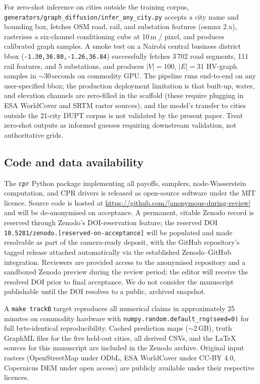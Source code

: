 \documentclass[10pt,a4paper]{article}
\begin{document}
For zero-shot inference on cities outside the training corpus,
\texttt{generators/graph\_diffusion/infer\_any\_city.py} accepts
a city name and bounding box, fetches OSM road, rail, and
substation features (osmnx 2.x), rasterises a six-channel
conditioning cube at 10\,m / pixel, and produces calibrated
graph samples. A smoke test on a Nairobi central business
district bbox (\texttt{-1.30,36.80,-1.26,36.84}) successfully
fetches 3\,702 road segments, 111 rail features, and 5
substations, and produces $|V| = 100$, $|E| = 31$ HV-graph
samples in $\sim$30\,seconds on commodity GPU. The pipeline
runs end-to-end on any user-specified bbox; the production
deployment limitation is that built-up, water, and elevation
channels are zero-filled in the scaffold (these require
plugging in ESA WorldCover and SRTM raster sources), and the
model's transfer to cities outside the 21-city DUPT corpus
is not validated by the present paper. Treat zero-shot outputs
as informed guesses requiring downstream validation, not
authoritative grids.

\subsection{Code and data availability}

The \texttt{cpr} Python package implementing all payoffs, samplers,
node-Wasserstein computation, and CPR drivers is released as
open-source software under the MIT licence. Source code is hosted
at \url{https://github.com/[anonymous-during-review]} and will be
de-anonymised on acceptance. A permanent, citable Zenodo record
is reserved through Zenodo's DOI-reservation feature; the reserved
DOI \texttt{10.5281/zenodo.[reserved-on-acceptance]} will be
populated and made resolvable as part of the camera-ready
deposit, with the GitHub repository's tagged release attached
automatically via the established Zenodo--GitHub integration.
Reviewers are provided access to the anonymised repository and a
sandboxed Zenodo preview during the review period; the editor
will receive the resolved DOI prior to final acceptance. We do
not consider the manuscript publishable until the DOI resolves to
a public, archived snapshot.

A \texttt{make trackB} target reproduces all numerical claims in
approximately 25 minutes on commodity hardware with
\texttt{numpy.random.default\_rng(seed=0)} for full byte-identical
reproducibility. Cached prediction maps ($\sim$2\,GB), truth
GraphML files for the five held-out cities, all derived CSVs, and
the LaTeX sources for this manuscript are included in the Zenodo
archive. Original input rasters (OpenStreetMap under ODbL, ESA
WorldCover under CC-BY 4.0, Copernicus DEM under open access) are
publicly available under their respective licences.
\end{document}
